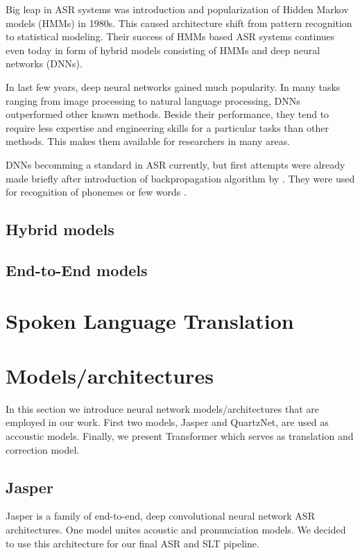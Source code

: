 Big leap in ASR systems was introduction and popularization of Hidden Markov models (HMMs) in 1980s. This caused architecture shift from pattern recognition to statistical modeling. Their success of HMMs based ASR systems continues even today in form of hybrid models consisting of HMMs and deep neural networks (DNNs).

In last few years, deep neural networks gained much popularity. In many tasks ranging from image processing to natural language processing, DNNs outperformed other known methods. Beside their performance, they tend to require less expertise and engineering skills for a particular tasks than other methods. This makes them available for researchers in many areas.

DNNs becomming a standard in ASR currently, but first attempts were already made briefly after introduction of backpropagation algorithm by . They were used for recognition of phonemes  or few words .

\subsection{Hybrid models}
\subsection{End-to-End models}

\section{Spoken Language Translation}

\section{Models/architectures}
In this section we introduce neural network models/architectures that are employed in our work. First two models, Jasper and QuartzNet, are used as accoustic models. Finally, we present Transformer which serves as translation and correction model.

\subsection{Jasper}

Jasper  is a family of end-to-end, deep convolutional neural network ASR architectures. One model unites acoustic and pronunciation models. We decided to use this architecture for our final ASR and SLT pipeline.

